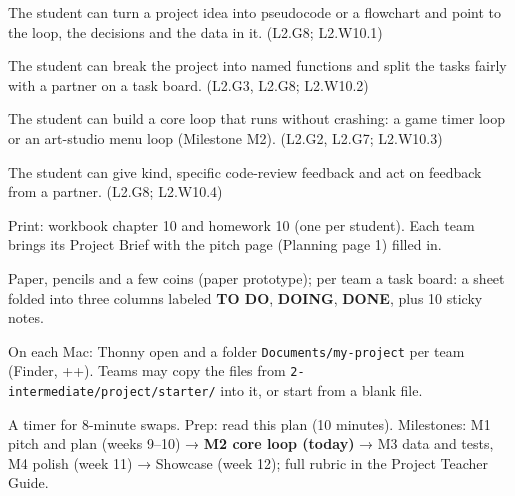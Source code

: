 
\begin{objectives}
  \item The student can turn a project idea into pseudocode or a flowchart and point to the loop, the decisions and the data in it. (L2.G8; L2.W10.1)
  \item The student can break the project into named functions and split the tasks fairly with a partner on a task board. (L2.G3, L2.G8; L2.W10.2)
  \item The student can build a core loop that runs without crashing: a game timer loop or an art-studio menu loop (Milestone M2). (L2.G2, L2.G7; L2.W10.3)
  \item The student can give kind, specific code-review feedback and act on feedback from a partner. (L2.G8; L2.W10.4)
\end{objectives}

\begin{materials}
  \item Print: workbook chapter 10 and homework 10 (one per student). Each team brings its Project Brief with the pitch page (Planning page 1) filled in.
  \item Paper, pencils and a few coins (paper prototype); per team a task board: a sheet folded into three columns labeled \textbf{TO DO}, \textbf{DOING}, \textbf{DONE}, plus 10 sticky notes.
  \item On each Mac: Thonny open and a folder \texttt{Documents/my-project} per team (Finder, ++). Teams may copy the files from \texttt{2-intermediate/project/starter/} into it, or start from a blank file.
  \item A timer for 8-minute swaps. Prep: read this plan (10 minutes). Milestones: M1 pitch and plan (weeks 9--10) → \textbf{M2 core loop (today)} → M3 data and tests, M4 polish (week 11) → Showcase (week 12); full rubric in the Project Teacher Guide.
\end{materials}

